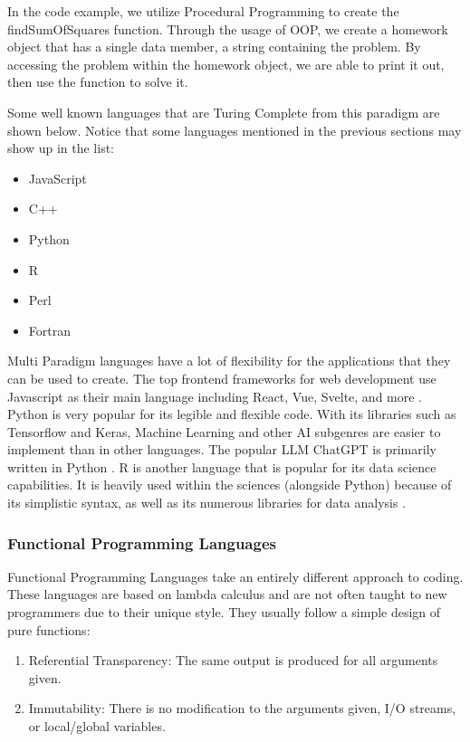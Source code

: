 In the code example, we utilize Procedural Programming to create the findSumOfSquares function.
Through the usage of OOP, we create a homework object that has a single data member, a string containing the problem.
By accessing the problem within the homework object, we are able to print it out, then use the function to solve it.

Some well known languages that are Turing Complete from this paradigm are shown below.
Notice that some languages mentioned in the previous sections may show up in the list: 
\begin{itemize}
    \item JavaScript
    \item C++
    \item Python
    \item R
    \item Perl
    \item Fortran
\end{itemize}

Multi Paradigm languages have a lot of flexibility for the applications that they can be used to create.
The top frontend frameworks for web development use Javascript as their main language including React, Vue, Svelte, and more \cite{JSPopular}.
Python is very popular for its legible and flexible code.
With its libraries such as Tensorflow and Keras, Machine Learning and other AI subgenres are easier to implement than in other languages.
The popular LLM ChatGPT is primarily written in Python \cite{ChatGPTPython}.
R is another language that is popular for its data science capabilities.
It is heavily used within the sciences (alongside Python) because of its simplistic syntax, as well as its numerous libraries for data analysis \cite{RDataSci,DataSciLangs}.

\subsubsection{Functional Programming Languages}\label{subsubsec:FPL}

Functional Programming Languages take an entirely different approach to coding.
These languages are based on lambda calculus and are not often taught to new programmers due to their unique style.
They usually follow a simple design of pure functions:
\begin{enumerate}
    \item Referential Transparency: The same output is produced for all arguments given.
    \item Immutability: There is no modification to the arguments given, I/O streams, or local/global variables.
\end{enumerate}

